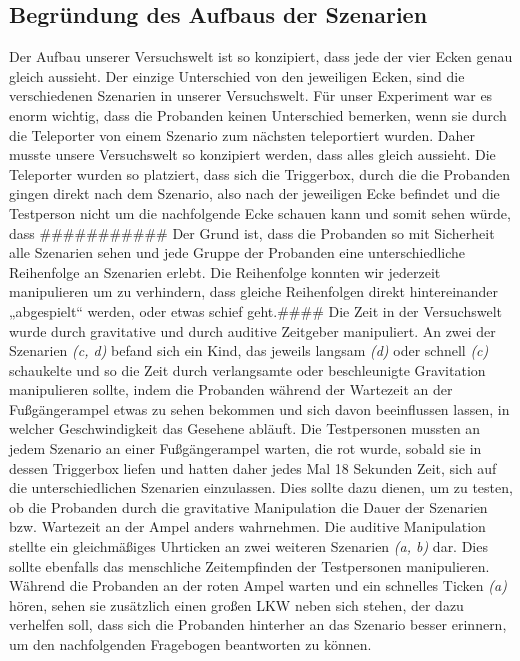 \documentclass{Paper}
\begin{document}
	\subsection{Begründung des Aufbaus der Szenarien}
		Der Aufbau unserer Versuchswelt ist so konzipiert, dass jede der vier Ecken genau gleich aussieht. Der einzige Unterschied von den jeweiligen Ecken, sind die verschiedenen Szenarien in unserer Versuchswelt.
		Für unser Experiment war es enorm wichtig, dass die Probanden keinen Unterschied bemerken, wenn sie durch die Teleporter von einem Szenario zum nächsten teleportiert wurden. Daher musste unsere Versuchswelt so konzipiert werden, dass alles gleich aussieht. Die Teleporter wurden so platziert, dass sich die Triggerbox, durch die die Probanden gingen direkt nach dem Szenario, also nach der jeweiligen Ecke befindet und die Testperson nicht um die nachfolgende Ecke schauen kann und somit sehen würde, dass \#\#\#\#\#\#\#\#\#\#\#
		Der Grund ist, dass die Probanden so mit Sicherheit alle Szenarien sehen und jede Gruppe der Probanden eine unterschiedliche Reihenfolge an Szenarien erlebt. Die Reihenfolge konnten wir jederzeit manipulieren um zu verhindern, dass gleiche Reihenfolgen direkt hintereinander „abgespielt“ werden, oder etwas schief geht.\#\#\#\#
		Die Zeit in der Versuchswelt wurde durch gravitative und durch auditive Zeitgeber manipuliert.  An zwei der Szenarien \textit{(c, d)} befand sich ein Kind, das jeweils langsam  \textit{(d)} oder schnell \textit{(c)} schaukelte und so die Zeit durch verlangsamte oder beschleunigte Gravitation manipulieren sollte, indem die Probanden während der Wartezeit an der Fußgängerampel etwas zu sehen bekommen und sich davon beeinflussen lassen, in welcher Geschwindigkeit das Gesehene abläuft. 
		Die Testpersonen mussten an jedem Szenario an einer  Fußgängerampel warten, die rot wurde, sobald sie in dessen Triggerbox liefen und hatten daher jedes Mal 18 Sekunden Zeit, sich auf die unterschiedlichen Szenarien einzulassen. 
		Dies sollte dazu dienen, um zu testen, ob die Probanden durch die gravitative Manipulation die Dauer der Szenarien bzw. Wartezeit an der Ampel anders wahrnehmen. 
		Die auditive Manipulation stellte ein gleichmäßiges Uhrticken an zwei weiteren Szenarien \textit{(a, b)} dar. Dies sollte ebenfalls das menschliche Zeitempfinden der Testpersonen manipulieren. Während die Probanden an der roten Ampel warten und ein schnelles Ticken \textit{(a)} hören, sehen sie zusätzlich einen großen LKW neben sich stehen, der dazu verhelfen soll, dass sich die Probanden hinterher an das Szenario besser erinnern, um den nachfolgenden Fragebogen beantworten zu können.
\end{document}
